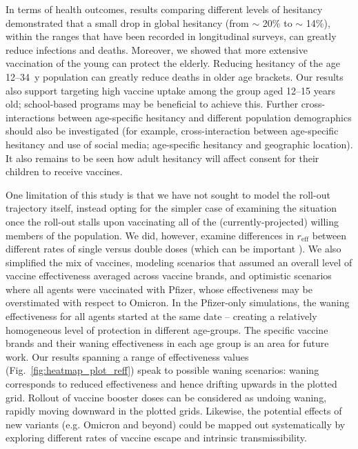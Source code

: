 \documentclass[article, a4, authoryear]{elsarticle}
\begin{document}
In terms of health outcomes, results comparing different levels of hesitancy demonstrated that a small drop in global hesitancy (from $\sim$ 20\% to $\sim$ 14\%), within the ranges that have been recorded in longitudinal surveys, can greatly reduce infections and deaths. Moreover, we showed that more extensive vaccination of the young can protect the elderly. Reducing hesitancy of the age 12--34~y population can greatly reduce deaths in older age brackets. Our results also support targeting high vaccine uptake among the group aged 12--15 years old; school-based programs may be beneficial to achieve this.  Further cross-interactions between age-specific hesitancy and different population demographics should also be investigated (for example, cross-interaction between age-specific hesitancy and use of social media; age-specific hesitancy and geographic location). It also remains to be seen how adult hesitancy will affect consent for their children to receive vaccines.

One limitation of this study is that we have not sought to model the roll-out trajectory itself, instead opting for the simpler case of examining the situation once the roll-out stalls upon vaccinating all of the (currently-projected) willing members of the population. We did, however, examine differences in $r_\mathrm{eff}$ between different rates of single versus double doses (which can be important \cite{bernal_delta_2021,voysey2021safety,williams_outbreak_2021}). We also simplified the mix of vaccines, modeling scenarios that assumed an overall level of vaccine effectiveness averaged across vaccine brands, and optimistic scenarios where all agents were vaccinated with Pfizer, whose effectiveness may be overstimated with respect to Omicron. In the Pfizer-only simulations, the waning effectiveness for all agents started at the same date -- creating a relatively homogeneous level of protection in different age-groups. The specific vaccine brands and their waning effectiveness in each age group is an area for future work. Our results spanning a range of effectiveness values (Fig.~\ref{fig:heatmap_plot_reff}) speak to possible waning scenarios: waning corresponds to reduced effectiveness and hence drifting upwards in the plotted grid. Rollout of vaccine booster doses can be considered as undoing waning, rapidly moving downward in the plotted grids. Likewise, the potential effects of new variants (e.g. Omicron and beyond) could be mapped out systematically by exploring different rates of vaccine escape and intrinsic transmissibility.
\end{document}
